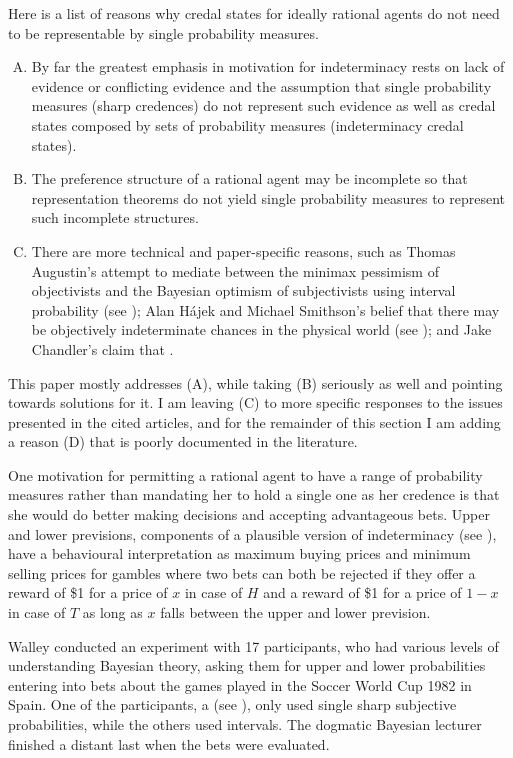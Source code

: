 Here is a list of reasons why credal states for ideally
rational agents do not need to be representable by
single probability measures.

\begin{enumerate}[(A)]
\item By far the greatest emphasis in motivation for
  indeterminacy rests on lack of evidence or
  conflicting evidence and the assumption that single
  probability measures (sharp credences) do not
  represent such evidence as well as credal states
  composed by sets of probability measures
  (indeterminacy credal states).
\item The preference structure of a rational agent may
  be incomplete so that representation theorems do not
  yield single probability measures to represent such
  incomplete structures.
\item There are more technical and paper-specific
  reasons, such as Thomas Augustin's attempt to mediate
  between the minimax pessimism of objectivists and the
  Bayesian optimism of subjectivists using interval
  probability (see ); Alan
  H{\'a}jek and Michael Smithson's belief that there
  may be objectively indeterminate chances in the
  physical world (see );
  and Jake Chandler's claim that  .
\end{enumerate}

This paper mostly addresses (A), while taking (B)
seriously as well and pointing towards solutions for
it. I am leaving (C) to more specific responses to the
issues presented in the cited articles, and for the
remainder of this section I am adding a reason (D) that
is poorly documented in the literature.

One motivation for permitting a rational agent to have
a range of probability measures rather than mandating
her to hold a single one as her credence is that she
would do better making decisions and accepting
advantageous bets. Upper and lower previsions,
components of a plausible version of indeterminacy (see
), have a behavioural
interpretation as maximum buying prices and minimum
selling prices for gambles where two bets can both be
rejected if they offer a reward of \$1 for a price of
$x$ in case of $H$ and a reward of \$1 for a price of
$1-x$ in case of $T$ as long as $x$ falls between the
upper and lower prevision.

Walley conducted an experiment with 17 participants,
who had various levels of understanding Bayesian
theory, asking them for upper and lower probabilities
entering into bets about the games played in the Soccer
World Cup 1982 in Spain. One of the participants, a
 (see
), only used single sharp
subjective probabilities, while the others used
intervals. The dogmatic Bayesian lecturer finished a
distant last when the bets were evaluated.

